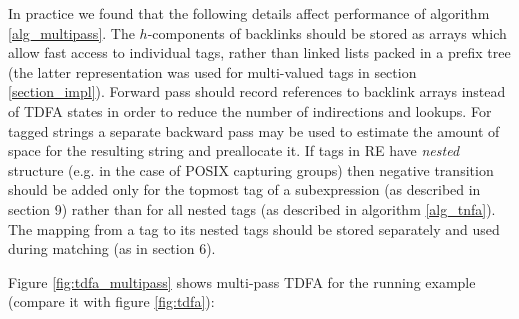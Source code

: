 \documentclass[]{article}
\begin{document}
In practice we found that the following details affect performance of algorithm \ref{alg_multipass}.
The $h$-components of backlinks should be stored as arrays which allow fast access to individual tags,
rather than linked lists packed in a prefix tree (the latter representation was used for multi-valued tags in section \ref{section_impl}).
Forward pass should record references to backlink arrays instead of TDFA states in order to reduce the number of indirections and lookups.
For tagged strings a separate backward pass may be used to estimate the amount of space for the resulting string and preallocate it.
If tags in RE have \emph{nested} structure (e.g. in the case of POSIX capturing groups)
then negative transition should be added only for the topmost tag of a subexpression (as described in \cite{BorTro19} section 9)
rather than for all nested tags (as described in algorithm \ref{alg_tnfa}).
The mapping from a tag to its nested tags should be stored separately and used during matching (as in \cite{BorTro19} section 6).
\medskip

Figure \ref{fig:tdfa_multipass} shows multi-pass TDFA for the running example (compare it with figure \ref{fig:tdfa}):
\medskip
\end{document}
